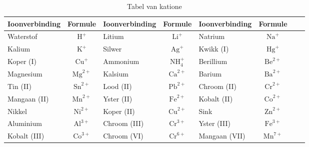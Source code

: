 \begin{enumerate}[noitemsep, label=\textbf{\arabic*}. ]

\begin{table}[H]
\begin{center}
\label{tab:cations}
\begin{tabular}{|l|c|l|c|l|c|l|c|} \hline
\textbf{Ioonverbinding} & \textbf{Formule} & \textbf{Ioonverbinding} & \textbf{Formule} & \textbf{Ioonverbinding} & \textbf{Formule}  \\ \hline
Waterstof       & $\text{H}^{+}$   & Litium          & $\text{Li}^{+}$     & Natrium          & $\text{Na}^{+}$  \\ \hline
Kalium          & $\text{K}^{+}$   & Silwer          & $\text{Ag}^{+}$     & Kwikk (I)        & $\text{Hg}^{+}$  \\ \hline
Koper (I)       & $\text{Cu}^{+}$  & Ammonium        & $\text{NH}_{4}^{+}$ & Berillium        & $\text{Be}^{2+}$ \\ \hline
Magnesium       & $\text{Mg}^{2+}$ & Kalsium         & $\text{Ca}^{2+}$    & Barium           & $\text{Ba}^{2+}$ \\ \hline
Tin (II)        & $\text{Sn}^{2+}$ & Lood (II)       & $\text{Pb}^{2+}$    & Chroom (II)      & $\text{Cr}^{2+}$ \\ \hline
Mangaan (II)    & $\text{Mn}^{2+}$ & Yster (II)      & $\text{Fe}^{2+}$    & Kobalt (II)      & $\text{Co}^{2+}$ \\ \hline
Nikkel          & $\text{Ni}^{2+}$ & Koper (II)      & $\text{Cu}^{2+}$    & Sink             & $\text{Zn}^{2+}$ \\ \hline
Aluminium       & $\text{Al}^{3+}$ & Chroom (III)    & $\text{Cr}^{3+}$    & Yster (III)      & $\text{Fe}^{3+}$ \\ \hline
Kobalt (III)    & $\text{Co}^{3+}$ & Chroom (VI)     & $\text{Cr}^{6+}$    & Mangaan (VII)    & $\text{Mn}^{7+}$ \\ \hline

\end{tabular}

 \end{center}
\caption{Tabel van katione}
\label{tab:cations}
\end{table}


\end{enumerate}
